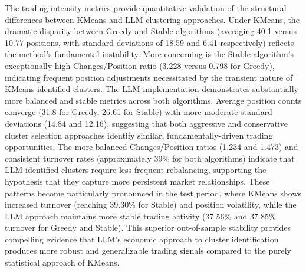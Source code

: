 

The trading intensity metrics provide quantitative validation of the structural differences between KMeans and LLM clustering approaches. Under KMeans, the dramatic disparity between Greedy and Stable algorithms (averaging 40.1 versus 10.77 positions, with standard deviations of 18.59 and 6.41 respectively) reflects the method's fundamental instability. More concerning is the Stable algorithm's exceptionally high Changes/Position ratio (3.228 versus 0.798 for Greedy), indicating frequent position adjustments necessitated by the transient nature of KMeans-identified clusters.
The LLM implementation demonstrates substantially more balanced and stable metrics across both algorithms. Average position counts converge (31.8 for Greedy, 26.61 for Stable) with more moderate standard deviations (14.84 and 12.16), suggesting that both aggressive and conservative cluster selection approaches identify similar, fundamentally-driven trading opportunities. The more balanced Changes/Position ratios (1.234 and 1.473) and consistent turnover rates (approximately 39\% for both algorithms) indicate that LLM-identified clusters require less frequent rebalancing, supporting the hypothesis that they capture more persistent market relationships.
These patterns become particularly pronounced in the test period, where KMeans shows increased turnover (reaching 39.30\% for Stable) and position volatility, while the LLM approach maintains more stable trading activity (37.56\% and 37.85\% turnover for Greedy and Stable). This superior out-of-sample stability provides compelling evidence that LLM's economic approach to cluster identification produces more robust and generalizable trading signals compared to the purely statistical approach of KMeans.


